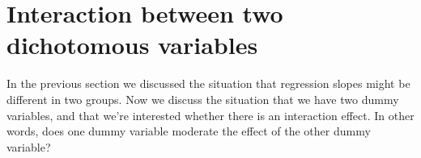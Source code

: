 \documentclass[]{book}\usepackage[]{graphicx}\usepackage[]{color}
\begin{document}
% 
% 
% 
% 
% 
% 




\section{Interaction between two dichotomous variables}

In the previous section we discussed the situation that regression slopes might be different in two groups. Now we discuss the situation that we have two dummy variables, and that we're interested whether there is an interaction effect. In other words, does one dummy variable moderate the effect of the other dummy variable?
\end{document}
